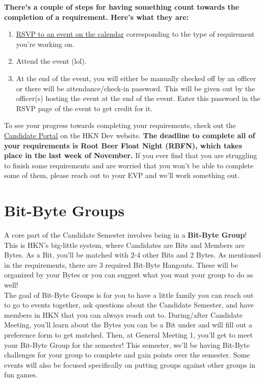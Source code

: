 \documentclass[11pt, article, oneside]{memoir}
\begin{document}
        \textbf{
            There's a couple of steps for having something count towards the completion of a requirement.
            Here's what they are:
        }
        \begin{enumerate}
            \item
                \href{https://hkn.mu/cal}{RSVP to an event on the calendar} corresponding to the type of requirement you're working on.
            \item
                Attend the event (lol).
            \item
                At the end of the event, you will either be manually checked off by an officer or there will be attendance/check-in password.
                This will be given out by the officer(s) hosting the event at the end of the event.
                Enter this password in the RSVP page of the event to get credit for it.
        \end{enumerate}
        To see your progress towards completing your requirements, check out the \href{https://hkn.mu/candportal}{Candidate Portal} on the HKN Dev website.
        \textbf{The deadline to complete all of your requirements is Root Beer Float Night (RBFN), which takes place in the last week of November.}
        If you ever find that you are struggling to finish some requirements and are worried that you won't be able to complete some of them, please reach out to your EVP and we'll work something out.
    
    \section{Bit-Byte Groups}
    \label{sec:bit-byte-groups}
        A core part of the Candidate Semester involves being in a \textbf{Bit-Byte Group}!
        This is HKN's big-little system, where Candidates are Bits and Members are Bytes.
        As a Bit, you'll be matched with 2-4 other Bits and 2 Bytes.
        As mentioned in the requirements, there are 3 required Bit-Byte Hangouts.
        These will be organized by your Bytes or you can suggest what you want your group to do as well! \\

        The goal of Bit-Byte Groups is for you to have a little family you can reach out to go to events together, ask questions about the Candidate Semester, and have members in HKN that you can always reach out to.
        During/after Candidate Meeting, you'll learn about the Bytes you can be a Bit under and will fill out a preference form to get matched.
        Then, at General Meeting 1, you'll get to meet your Bit-Byte Group for the semester!
        This semester, we'll be having Bit-Byte challenges for your group to complete and gain points over the semester.
        Some events will also be focused specifically on putting groups against other groups in fun games. \\
\end{document}
